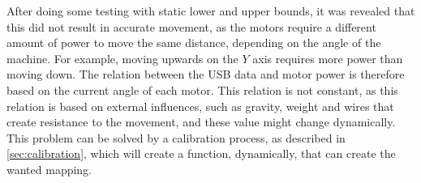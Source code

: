 After doing some testing with static lower and upper bounds, it was revealed that this did not result in accurate movement, as the motors require a different amount of power to move the same distance, depending on the angle of the machine.
For example, moving upwards on the $Y$ axis requires more power than moving down.
The relation between the USB data and motor power is therefore based on the current angle of each motor.
This relation is not constant, as this relation is based on external influences, such as gravity, weight and wires that create resistance to the movement, and these value might change dynamically.
This problem can be solved by a calibration process, as described in \autoref{sec:calibration}, which will create a function, dynamically, that can create the wanted mapping.
